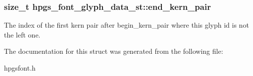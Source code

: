 \subsubsection[{end\_\-kern\_\-pair}]{\setlength{\rightskip}{0pt plus 5cm}size\_\-t {\bf hpgs\_\-font\_\-glyph\_\-data\_\-st::end\_\-kern\_\-pair}}\label{structhpgs__font__glyph__data__st_a63c1df381b30f6e61d99d6bcea5a0e10}
The index of the first kern pair after {\ttfamily begin\_\-kern\_\-pair} where this glyph id is not the left one. 

The documentation for this struct was generated from the following file:\begin{DoxyCompactItemize}
\item 
hpgsfont.h\end{DoxyCompactItemize}
